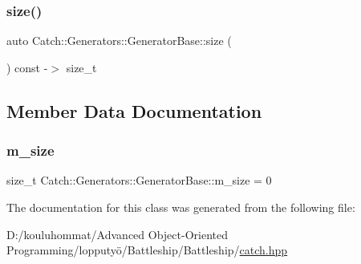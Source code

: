 \subsubsection{\texorpdfstring{size()}{size()}}
{\footnotesize\ttfamily auto Catch\+::\+Generators\+::\+Generator\+Base\+::size (\begin{DoxyParamCaption}{ }\end{DoxyParamCaption}) const -\/$>$ size\+\_\+t \hspace{0.3cm}{\ttfamily [inline]}}



\subsection{Member Data Documentation}
\mbox{\label{class_catch_1_1_generators_1_1_generator_base_ac6ab90adfdda9401e2ea03db5b2dfc6a}} 
\subsubsection{\texorpdfstring{m\+\_\+size}{m\_size}}
{\footnotesize\ttfamily size\+\_\+t Catch\+::\+Generators\+::\+Generator\+Base\+::m\+\_\+size = 0\hspace{0.3cm}{\ttfamily [protected]}}



The documentation for this class was generated from the following file\+:\begin{DoxyCompactItemize}
\item 
D\+:/kouluhommat/\+Advanced Object-\/\+Oriented Programming/lopputyö/\+Battleship/\+Battleship/\mbox{\hyperlink{catch_8hpp}{catch.\+hpp}}\end{DoxyCompactItemize}

